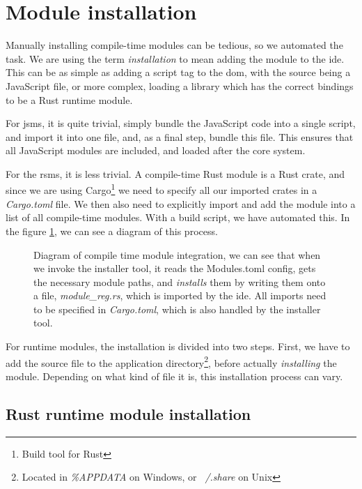 \section{Module installation} \label{sec:module-installation}

Manually installing compile-time modules can be tedious, so we automated the
task. We are using the term \textit{installation} to mean adding the module to
the \gls*{ide}. This can be as simple as adding a script tag to the \gls*{dom},
with the source being a JavaScript file, or more complex, loading a library
which has the correct bindings to be a Rust runtime module.

For \gls*{jsms}, it is quite trivial, simply bundle the JavaScript code into a
single script, and import it into one file, and, as a final step, bundle this
file. This ensures that all JavaScript modules are included, and loaded after
the core system.

For the \gls*{rsms}, it is less trivial. A compile-time Rust module is a Rust
crate, and since we are using Cargo\footnote{Build tool for Rust} we need to
specify all our imported crates in a \textit{Cargo.toml} file. We then also
need to explicitly import and add the module into a list of all compile-time
modules. With a build script, we have automated this. In the figure
\ref{fig:compMod}, we can see a diagram of this process.

\begin{figure}
  \centering
  
  \caption{
    Diagram of compile time module integration, we can see that when we invoke
    the installer tool, it reads the Modules.toml config, gets the necessary
    module paths, and \textit{installs} them by writing them onto a file,
    \textit{module\_reg.rs}, which is imported by the \gls*{ide}. All imports
    need to be specified in \textit{Cargo.toml}, which is also handled by the
    installer tool.
  }
  \label{fig:compMod}
\end{figure}

For runtime modules, the installation is divided into two steps. First, we have
to add the source file to the application directory\footnote{Located in \textit{\%APPDATA} on Windows, or \textit{~/.share} on Unix},
before actually \textit{installing} the module. Depending on what kind of file
it is, this installation process can vary.


\subsection{Rust runtime module installation}

